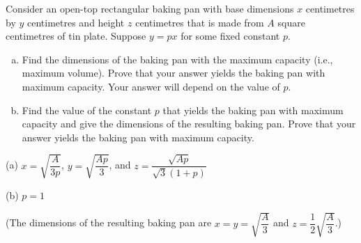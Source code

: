 \begin{question}[2010H]\label{s3.5.3formulalast}
Consider an open-top rectangular baking pan with base dimensions
$x$ centimetres by $y$ centimetres and height $z$ centimetres that is
made from $A$ square centimetres of tin plate. Suppose $y = px$ for some
fixed constant $p$.
\begin{enumerate}[(a)]
\item Find the dimensions of the baking pan with the maximum
capacity (i.e., maximum volume). Prove that your answer yields the
baking pan with maximum capacity. Your answer will depend on the value of $p$.
\item Find the value of the constant $p$ that yields the baking
pan with maximum capacity and give the dimensions of the resulting
baking pan. Prove that your answer yields the baking pan with maximum
capacity.
\end{enumerate}
\end{question}
\begin{answer}
(a)
$x=\sqrt{\dfrac{A}{3p}}$,
$y=\sqrt{\dfrac{Ap}{3}}$, and
$z=\dfrac{\sqrt{Ap}}{\sqrt{3}(1+p)}$

(b) $p=1$

(The dimensions of the resulting baking pan are
      $x=y=\sqrt{ \dfrac{A}{3} }$ and $z=\dfrac{1}{2}\sqrt{ \dfrac{A}{3} }$.)
\end{answer}

